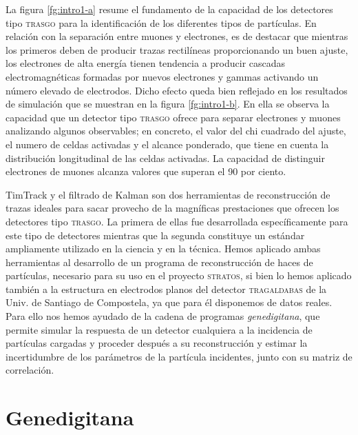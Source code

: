 \documentclass[a4paper]{article}
\begin{document}
La figura \ref{fg:intro1-a} resume el fundamento de la capacidad de los detectores tipo \textsc{trasgo} para la identificación de los diferentes tipos de partículas. En relación con la separación entre muones y electrones, es de destacar que mientras los primeros deben de producir trazas rectilíneas proporcionando un buen ajuste, los electrones de alta energía tienen tendencia a producir cascadas electromagnéticas formadas por nuevos electrones y gammas activando un número elevado de electrodos. Dicho efecto queda bien reflejado en los resultados de simulación que se muestran en la figura \ref{fg:intro1-b}. En ella se observa la capacidad que un detector tipo \textsc{trasgo} ofrece para separar electrones y muones analizando algunos observables; en concreto, el valor del chi cuadrado del ajuste, el numero de celdas activadas y el alcance ponderado, que tiene en cuenta la distribución longitudinal de las celdas activadas. La capacidad de distinguir electrones de muones alcanza valores que superan el 90 por ciento.

TimTrack \cite{ttrack} y el filtrado de Kalman \cite{joaneh} son dos herramientas de reconstrucción de trazas ideales para sacar provecho de la magníficas prestaciones que ofrecen los detectores tipo \textsc{trasgo}. La primera de ellas fue desarrollada específicamente para este tipo de detectores mientras que la segunda constituye un estándar ampliamente utilizado en la ciencia y en la técnica. Hemos aplicado ambas herramientas al desarrollo de un programa de reconstrucción de haces de partículas, necesario para su uso en el proyecto \textsc{stratos}, si bien lo hemos aplicado también a la estructura en electrodos planos del detector \textsc{tragaldabas} de la Univ. de Santiago de Compostela, ya que para él disponemos de datos reales. Para ello nos hemos ayudado de la cadena de programas \textit{genedigitana}, que permite simular la respuesta de un detector cualquiera a la incidencia de partículas cargadas y proceder después a su reconstrucción y estimar la incertidumbre de los parámetros de la partícula incidentes, junto con su matriz de correlación.



\section{Genedigitana}
\end{document}
